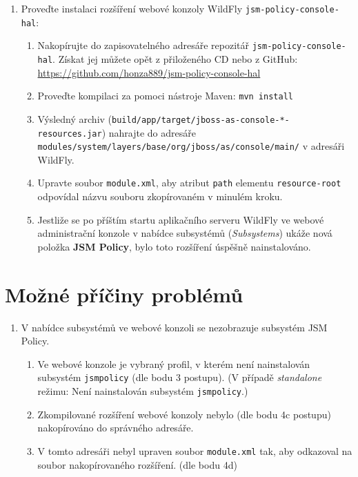 \begin{enumerate}
  \item Proveďte instalaci rozšíření webové konzoly WildFly {\tt jsm-policy-console-hal}:
  \begin{enumerate}
    \item Nakopírujte do zapisovatelného adresáře repozitář {\tt jsm-policy-console-hal}. Získat jej můžete opět z přiloženého CD nebo z GitHub:
      \newline\url{https://github.com/honza889/jsm-policy-console-hal}
    \item Proveďte kompilaci za pomoci nástroje Maven: {\tt mvn install}
    \item Výsledný archiv ({\tt build/app/target/jboss-as-console-*-resources.jar}) nahrajte do adresáře {\tt modules/system/layers/base/org/jboss/as/console/main/} v adresáři WildFly.
    \item Upravte soubor {\tt module.xml}, aby atribut {\tt path} elementu {\tt resource-root} odpovídal názvu souboru zkopírovaném v minulém kroku.    
    \item Jestliže se po příštím startu aplikačního serveru WildFly ve webové administrační konzole v nabídce subsystémů ({\it Subsystems}) ukáže nová položka {\bf JSM Policy}, bylo toto rozšíření úspěšně nainstalováno.
  \end{enumerate}
  
\end{enumerate}


\section{Možné příčiny problémů}
\begin{enumerate}
    \item V nabídce subsystémů ve webové konzoli se nezobrazuje subsystém JSM Policy.
    \begin{enumerate}
        \item Ve webové konzole je vybraný profil, v kterém není nainstalován subsystém {\tt jsmpolicy} (dle bodu 3 postupu). (V případě {\it standalone} režimu: Není nainstalován subsystém {\tt jsmpolicy}.)
        \item Zkompilované rozšíření webové konzoly nebylo (dle bodu 4c postupu) nakopírováno do správného adresáře.
        \item V tomto adresáři nebyl upraven soubor {\tt module.xml} tak, aby odkazoval na soubor nakopírovaného rozšíření. (dle bodu 4d)
    \end{enumerate}
\end{enumerate}



